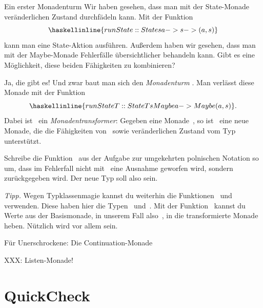 \documentclass{uebblatt}
\begin{document}
\begin{aufgabe}{Ein erster Monadenturm}
Wir haben gesehen, dass man mit der State-Monade veränderlichen Zustand
durchfädeln kann. Mit der Funktion
\[ \haskellinline{runState :: State s a -> s -> (a,s)} \]
kann man eine State-Aktion ausführen. Außerdem haben wir gesehen, dass man mit
der Maybe-Monade Fehlerfälle übersichtlicher behandeln kann. Gibt es eine
Möglichkeit, diese beiden Fähigkeiten zu kombinieren?

Ja, die gibt es! Und zwar baut man sich den \emph{Monadenturm}
. Man verlässt diese Monade mit der Funktion
\[ \haskellinline{runStateT :: StateT s Maybe a -> Maybe (a, s)}. \]
Dabei ist~ ein \emph{Monadentransformer}: Gegeben eine
Monade~, so ist~ eine neue Monade,
die die Fähigkeiten von~ sowie veränderlichen Zustand vom
Typ~ unterstützt.

Schreibe die Funktion~ aus der Aufgabe zur umgekehrten polnischen Notation so um, dass
im Fehlerfall nicht mit~ eine Ausnahme geworfen wird,
sondern~ zurückgegeben wird. Der neue Typ soll also
 sein.

{\scriptsize\emph{Tipp.} Wegen Typklassenmagie kannst du weiterhin die
Funktionen~ und~ verwenden. Diese haben
hier die Typen~
und~. Mit der
Funktion~ kannst du
Werte aus der Basismonade, in unserem Fall also~, in die
transformierte Monade heben. Nützlich wird vor allem  sein.\par}
\end{aufgabe}

\begin{aufgabe}{Für Unerschrockene: Die Continuation-Monade}
\end{aufgabe}

XXX: Listen-Monade!


\section{QuickCheck}
\end{document}
